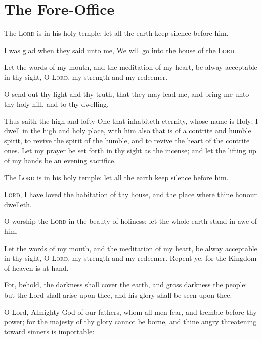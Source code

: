 \section{The Fore-Office}
\begin{multicols}{2}
The \textsc{Lord} is in his holy temple: let all the earth keep silence before him.
\par
  I was glad when they said unto me, We will go into the house of the \textsc{Lord}.
    \par
    Let the words of my mouth, and the meditation of my heart, be alway acceptable in thy sight, O \textsc{Lord}, my strength and my redeemer.
    \par
    O send out thy light and thy truth, that they may lead me, and bring me unto thy holy hill, and to thy dwelling.
    \par
    Thus saith the high and lofty One that inhabiteth eternity, whose name is Holy; I dwell in the high and holy place, with him also that is of a contrite and humble spirit, to revive the spirit of the humble, and to revive the heart of the contrite ones.
    Let my prayer be set forth in thy sight as the incense; and let the lifting up of my hands be an evening sacrifice.
    \par
    The \textsc{Lord} is in his holy temple: let all the earth keep silence before him.
    \par
    \textsc{Lord}, I have loved the habitation of thy house, and the place where thine honour dwelleth.
    \par
    O worship the \textsc{Lord} in the beauty of holiness; let the whole earth stand in awe of him.
    \par
    Let the words of my mouth, and the meditation of my heart, be alway acceptable in thy sight, O \textsc{Lord}, my strength and my redeemer.
	Repent ye, for the Kingdom of heaven is at hand.
	\par
	For, behold, the darkness shall cover the earth, and gross darkness the people: but the Lord shall arise upon thee, and his glory shall be seen upon thee. 
	\par
    O Lord, Almighty God of our fathers, whom all men fear, and tremble before thy power; for the majesty of thy glory cannot be borne, and thine angry threatening toward sinners is importable: 

\end{multicols}
